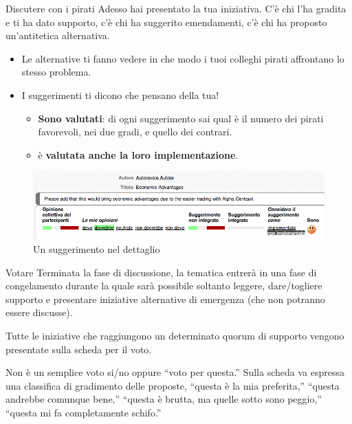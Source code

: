 \begin{frame}{Discutere con i pirati}
Adesso hai presentato la tua iniziativa. C'è chi l'ha gradita e ti ha dato supporto, c'è chi ha suggerito emendamenti, c'è chi ha proposto un'antitetica alternativa. \begin{itemize}\item Le alternative ti fanno vedere in che modo i tuoi colleghi pirati affrontano lo stesso problema. \item I suggerimenti ti dicono che pensano della tua!\begin{itemize}\item {\bfseries Sono valutati}: di ogni suggerimento sai qual è il numero dei pirati favorevoli, nei due gradi, e quello dei contrari. \item è {\bfseries valutata anche la loro implementazione}.\end{itemize}\end{itemize} \begin{figure}\includegraphics[width=\textwidth]{pics/suggerimento}
\caption{Un suggerimento nel dettaglio}
\end{figure}
\end{frame}

\begin{frame}{Votare}
Terminata la fase di discussione, la tematica entrerà in una fase di congelamento durante la quale sarà possibile soltanto leggere, dare/togliere supporto e presentare iniziative alternative di emergenza (che non potranno essere discusse).

Tutte le iniziative che raggiungono un determinato quorum di supporto vengono presentate sulla scheda per il voto.
\begin{block}{Non è un semplice voto si/no oppure ``voto per questa.''}
Sulla scheda va espressa una classifica di gradimento delle proposte, ``questa è la mia preferita,'' ``questa andrebbe comunque bene,'' ``questa è brutta, ma quelle sotto sono peggio,'' ``questa mi fa completamente schifo.''\end{block}
\end{frame}

